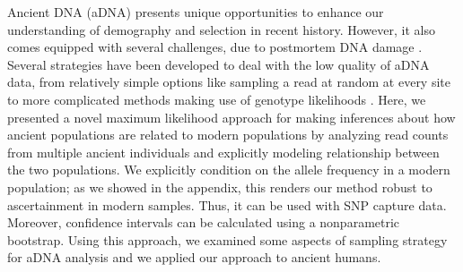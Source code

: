 \documentclass[11pt, oneside]{article}   	%
\begin{document}
Ancient DNA (aDNA) presents unique opportunities to enhance our understanding of demography and selection in recent history. However, it also comes equipped with several challenges, due to postmortem DNA damage \citep{sawyer2012temporal}. Several strategies have been developed to deal with the low quality of aDNA data, from relatively simple options like sampling a read at random at every site \citep{green2010draft} to more complicated methods making use of genotype likelihoods \citep{racimo2016joint}. Here, we presented a novel maximum likelihood approach for making inferences about how ancient populations are related to modern populations by analyzing read counts from multiple ancient individuals and explicitly modeling relationship between the two populations. We explicitly condition on the allele frequency in a modern population; as we showed in the appendix, this renders our method robust to ascertainment in modern samples. Thus, it can be used with SNP capture data. Moreover, confidence intervals can be calculated using a nonparametric bootstrap. Using this approach, we examined some aspects of sampling strategy for aDNA analysis and we applied our approach to ancient humans.
\end{document}
